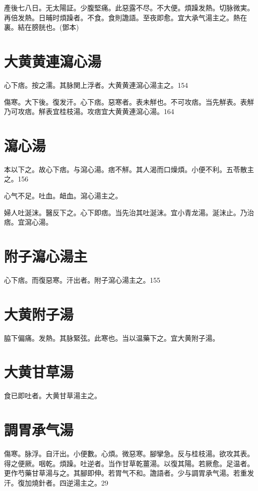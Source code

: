 \documentclass[12pt,twoside,UTF8,b5paper]{ctexbook}
\begin{document}
產後七八日。无太陽証。少腹堅痛。此惡露不尽。不大便。煩躁发熱。切脉微実。再倍发熱。日晡时煩躁者。不食。食則譫語。至夜即愈。宜大承气湯主之。熱在裏。結在膀胱也。(鄧本)

\section{大黄黄連瀉心湯}

心下痞。按之濡。其脉関上浮者。大黄{黄連}瀉心湯主之。154

傷寒。大下後。復发汗。心下痞。惡寒者。表未觧也。不可攻痞。当先觧表。表觧乃可攻痞。觧表宜桂枝湯。攻痞宜大黄黄連瀉心湯。164

\section{瀉心湯}

本以下之。故心下痞。与瀉心湯。痞不觧。其人渴而口燥{煩}。小便不利。五苓散主之。156

心气不足。吐血。衄血。瀉心湯主之。

婦人吐涎沫。醫反下之。心下即痞。当先治其吐涎沫。宜小青龙湯。涎沫止。乃治痞。宜瀉心湯。

\section{附子瀉心湯主}

心下痞。而復惡寒。汗出者。附子瀉心湯主之。155

\section{大黄附子湯}

脇下偏痛。{发熱。}其脉緊弦。此寒也。{当}以温藥下之。宜大黄附子湯。

\section{大黄甘草湯}

食已即吐者。大黄甘草湯主之。

\section{調胃承气湯}

傷寒。脉浮。自汗出。小便數。心煩。微惡寒。腳攣急。反与桂枝湯。欲攻其表。得之便厥。咽乾。煩躁。吐逆者。当作甘草乾薑湯。以復其陽。若厥愈。足温者。更作芍藥甘草湯与之。其腳即伸。若胃气不和。譫語者。少与{調胃}承气湯。若重发汗。復加燒針者。四逆湯主之。29
\end{document}
